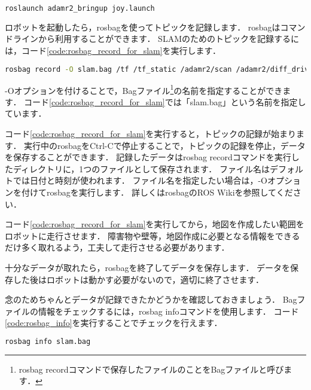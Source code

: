 \documentclass[{../../master}]{subfiles}
\begin{document}
\begin{lstlisting}[language=sh, label=code:bring_up_joy_for_slam, caption=Bring up Joystick]
roslaunch adamr2_bringup joy.launch
\end{lstlisting}

ロボットを起動したら，\textsf{rosbag}を使ってトピックを記録します．
\textsf{rosbag}はコマンドラインから利用することができます．
SLAMのためのトピックを記録するには，コード\ref{code:rosbag_record_for_slam}を実行します．

\begin{lstlisting}[language=sh, label=code:rosbag_record_for_slam, caption=Execute \textsf{rosbag} for SLAM]
rosbag record -O slam.bag /tf /tf_static /adamr2/scan /adamr2/diff_drive_controller/odom
\end{lstlisting}

\textsf{-O}オプションを付けることで，Bagファイル\footnote{\textsf{rosbag record}コマンドで保存したファイルのことをBagファイルと呼びます．}の名前を指定することができます．
コード\ref{code:rosbag_record_for_slam}では「\textsf{slam.bag}」という名前を指定しています．

コード\ref{code:rosbag_record_for_slam}を実行すると，トピックの記録が始まります．
実行中の\textsf{rosbag}を\textsf{Ctrl-C}で停止することで，トピックの記録を停止，データを保存することができます．
記録したデータは\textsf{rosbag record}コマンドを実行したディレクトリに，1つのファイルとして保存されます．
ファイル名はデフォルトでは日付と時刻が使われます．
ファイル名を指定したい場合は，\textsf{-O}オプションを付けて\textsf{rosbag}を実行します．
詳しくは\textsf{rosbag}のROS Wikiを参照してください．

コード\ref{code:rosbag_record_for_slam}を実行してから，地図を作成したい範囲をロボットに走行させます．
障害物や壁等，地図作成に必要となる情報をできるだけ多く取れるよう，工夫して走行させる必要があります．

十分なデータが取れたら，\textsf{rosbag}を終了してデータを保存します．
データを保存した後はロボットは動かす必要がないので，適切に終了させます．

念のためちゃんとデータが記録できたかどうかを確認しておきましょう．
Bagファイルの情報をチェックするには，\textsf{rosbag info}コマンドを使用します．
コード\ref{code:rosbag_info}を実行することでチェックを行えます．

\begin{lstlisting}[language=sh, label=code:rosbag_info, caption=Check the Bag File by \textsf{rosbag info}]
rosbag info slam.bag
\end{lstlisting}
\end{document}
